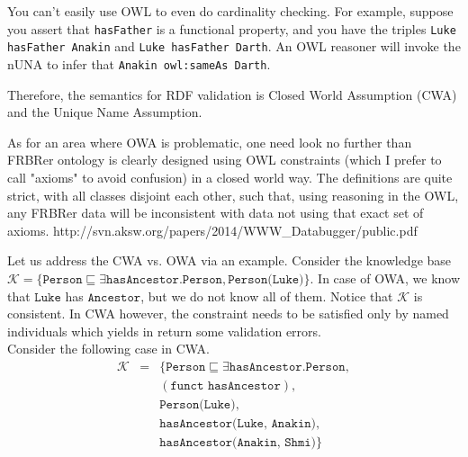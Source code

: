 \documentclass{llncs}
\newcommand{\ms}[1]{\texttt{#1}}
\newcommand{\tb}[1]{\todo[size=\small, color=green!40]{\textbf{Thomas:} #1}}
\begin{document}

You can't easily use OWL to even do cardinality checking. 
For example, suppose you assert that \ms{hasFather} is a functional property, and you have the triples \ms{Luke hasFather Anakin} and \ms{Luke hasFather Darth}.
An OWL reasoner will invoke the nUNA to infer that \ms{Anakin owl:sameAs Darth}.

Therefore, the semantics for RDF validation is Closed World Assumption (CWA) and the Unique Name Assumption.
 
As for an area where OWA is problematic, one need look no further than
FRBRer ontology is clearly designed using OWL constraints
(which I prefer to call "axioms" to avoid confusion) in a closed world
way. The definitions are quite strict, with all classes disjoint each
other, such that, using reasoning in the OWL, any FRBRer data will be
inconsistent with data not using that exact set of axioms. 
http://svn.aksw.org/papers/2014/WWW\_Databugger/public.pdf


Let us address the CWA vs. OWA via an example. Consider the knowledge base  $\mathcal{K} = \{\ms{Person} \sqsubseteq \exists \ms{hasAncestor.Person}, \ms{Person(Luke)}\}$. In case of OWA, we know that $\ms{Luke}$ has $\ms{Ancestor}$, but we do not know all of them. Notice that $\mathcal{K}$ is consistent. In CWA however, the constraint needs to be satisfied only by named individuals which yields in return some validation errors.\\
Consider the following case in CWA. 
\begin{eqnarray*}
\mathcal{K} &=  & \{\ms{Person} \sqsubseteq \exists \ms{hasAncestor.Person}, \\
 &&(\ms{funct }  \ms{hasAncestor}),\\  && \ms{Person(Luke)},\\ && \ms{hasAncestor(Luke, Anakin)},\\  && \ms{hasAncestor(Anakin, Shmi)}\}
\end{eqnarray*}
\end{document}
